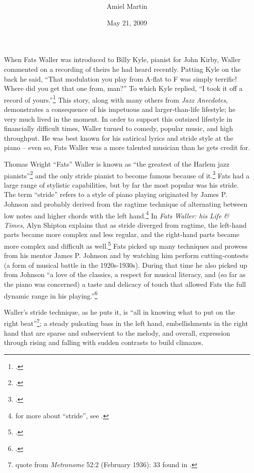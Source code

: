 \documentclass[11pt]{report}
\title{\fattitle \\
		\large \fatslogan}
\author{Amiel Martin}
\date{May 21, 2009}
\begin{document}
	\maketitle

	\label{sec:introduction}
	When Fats Waller was introduced to Billy Kyle, pianist for John Kirby, Waller commented on a recording of theirs he had heard recently. Patting Kyle on the back he said, ``That modulation you play from A-flat to F was simply terrific! Where did you get that one from, man?'' To which Kyle replied, ``I took it off a record of yours.''\footnote{\cite[231]{anecdotes}.} This story, along with many others from \emph{Jazz Anecdotes}, demonstrates a consequence of his impetuous and larger-than-life lifestyle; he very much lived in the moment. In order to support this outsized lifestyle in financially difficult times, Waller turned to comedy, popular music, and high throughput. He was best known for his satirical lyrics and stride style at the piano -- even so, Fats Waller was a more talented musician than he gets credit for.

	\label{sec:piano_skills}
	Thomas Wright ``Fats'' Waller is known as ``the greatest of the Harlem jazz pianists''\footnote{\cite[2]{life}.} and the only stride pianist to become famous because of it.\footnote{\cite[146]{visions}.} Fats had a large range of stylistic capabilities, but by far the most popular was his stride. The term ``stride'' refers to a style of piano playing originated by James P. Johnson and probably derived from the ragtime technique of alternating between low notes and higher chords with the left hand.\footnote{for more about ``stride'', see \cite[79]{experience}.} In \emph{Fats Waller: his Life \& Times}, Alyn Shipton explains that as stride diverged from ragtime, the left-hand parts became more complex and less regular, and the right-hand parts became more complex and difficult as well.\footnote{\cite[5]{life}.} Fats picked up many techniques and prowess from his mentor James P. Johnson and by watching him perform cutting-contests (a form of musical battle in the 1920s-1930s). During that time he also picked up from Johnson ``a love of the classics, a respect for musical literacy, and (so far as the piano was concerned) a taste and delicacy of touch that allowed Fats the full dynamic range in his playing.''\footnote{\cite[8]{life}.}
	
	Waller's stride technique, as he puts it, is ``all in knowing what to put on the right beat''\footnote{quote from \emph{Metronome} 52:2 (February 1936): 33 found in \cite{transcriptions}.}; a steady pulsating bass in the left hand, embellishments in the right hand that are sparse and subservient to the melody, and overall, expression through rising and falling with sudden contrasts to build climaxes.
	
\end{document}
